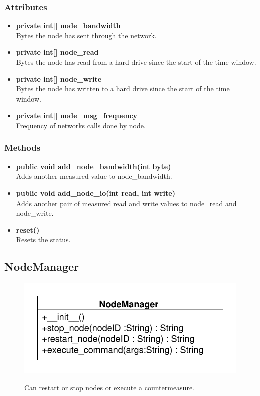 \subsubsection{Attributes}
\begin{itemize}
	\item \textbf{private int[] node\_bandwidth}\\
	Bytes the node has sent through the network.
	\item \textbf{private int[] node\_read}\\
	Bytes the node has read from a hard drive since the start of the time window.
	\item \textbf{private int[] node\_write}\\
	Bytes the node has written to a hard drive since the start of the time window.
	\item \textbf{private int[] node\_msg\_frequency}\\
	Frequency of networks calls done by node.
\end{itemize}

\subsubsection{Methods}
\begin{itemize}
	\item \textbf{public void add\_node\_bandwidth(int byte)}\\
	Adds another measured value  to node\_bandwidth.
	\item \textbf{public void add\_node\_io(int read, int write)}\\
	Adds another pair of measured read and write values to node\_read and node\_write.
	\item \textbf{reset()}\\
	Resets the status.
\end{itemize}

\subsection{NodeManager}
\begin{figure}[htbp]
	\begin{minipage}[t]{7cm}
		\vspace{0pt}
		\centering
		\includegraphics[scale=0.6]{./diagram_pictures/NodeInterface/NodeManager.pdf}
	\end{minipage}
	\hfill
	\begin{minipage}[t]{8cm}
		\vspace{10pt}
		Can restart or stop nodes or execute a countermeasure.
	\end{minipage}
\end{figure}


